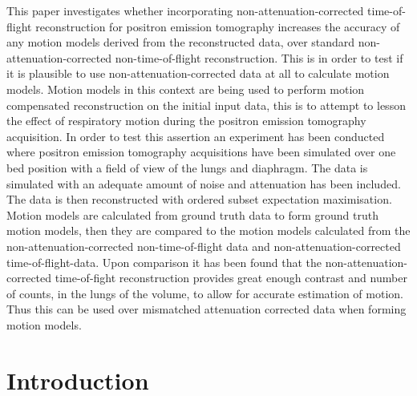 \documentclass[journal]{IEEEtran}
\begin{document}
This paper investigates whether incorporating non-attenuation-corrected time-of-flight reconstruction for positron emission tomography increases the accuracy of any motion models derived from the reconstructed data, over standard non-attenuation-corrected non-time-of-flight reconstruction. This is in order to test if it is plausible to use non-attenuation-corrected data at all to calculate motion models. Motion models in this context are being used to perform motion compensated reconstruction on the initial input data, this is to attempt to lesson the effect of respiratory motion during the positron emission tomography acquisition. In order to test this assertion an experiment has been conducted where positron emission tomography acquisitions have been simulated over one bed position with a field of view of the lungs and diaphragm. The data is simulated with an adequate amount of noise and attenuation has been included. The data is then reconstructed with ordered subset expectation maximisation. Motion models are calculated from ground truth data to form ground truth motion models, then they are compared to the motion models calculated from the non-attenuation-corrected non-time-of-flight data and non-attenuation-corrected time-of-flight-data. Upon comparison it has been found that the non-attenuation-corrected time-of-fight reconstruction provides great enough contrast and number of counts, in the lungs of the volume, to allow for accurate estimation of motion. Thus this can be used over mismatched attenuation corrected data when forming motion models.



\section{Introduction}
% 
% 
% 
% 
\end{document}
